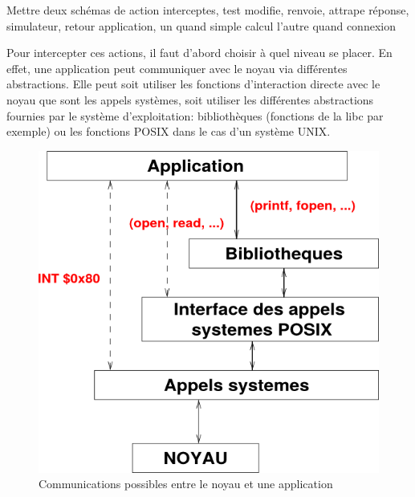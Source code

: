 {\color{red} Mettre deux schémas de action interceptes, test modifie, renvoie,
  attrape réponse, simulateur, retour application, un quand simple calcul
  l'autre quand connexion}

Pour intercepter ces actions, il faut d'abord choisir à quel niveau se placer.
 En effet, une application peut communiquer avec le noyau via différentes
 abstractions. Elle peut soit utiliser les fonctions d'interaction directe avec
 le noyau que sont les appels systèmes, soit utiliser les différentes
 abstractions fournies par le système d'exploitation: bibliothèques (fonctions
 de la libc par exemple) ou les fonctions POSIX dans le cas d'un système UNIX.

\begin{figure}[H]
 \centering
 \includegraphics[scale=0.5]{Pictures/png/Communication_application_noyau_v1.png}
 \caption{Communications possibles entre le noyau et une application}
 \label{AS_Communication}
\end{figure}

